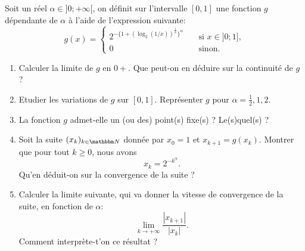 \begin{exercice}

Soit un réel $\alpha \in ]0;+\infty[$, on définit sur l'intervalle $[0,1]$ une fonction $g$ dépendante de $\alpha$ à l'aide de l'expression suivante:
\[
g(x) = \left\{
\begin{array}{ll}
2^{-\{ 1 + (\log_2(1/x))^{\frac1\alpha} \}^\alpha}&\quad \mbox{si } x\in]0;1],\\
0&\quad \mbox{sinon}.
\end{array}
\right.
\]

\begin{enumerate}

\item Calculer la limite de $g$ en $0+$. Que peut-on en déduire sur la continuité de $g$ ?

\item Etudier les variations de $g$ sur $[0,1]$. Représenter $g$ pour $\alpha = \frac12,1,2$.

\item La fonction $g$ admet-elle un (ou des) point(s) fixe(s) ? Le(s)quel(s) ?

\item Soit la suite $(x_k)_{k\in\eN}$ donnée par $x_0=1$ et $x_{k+1} = g(x_k)$. Montrer que pour tout $k\geq0$, nous avons
\[
x_{k} = 2^{-k^\alpha}.
\]
Qu'en déduit-on sur la convergence de la suite ?

\item Calculer la limite suivante, qui va donner la vitesse de convergence de la suite, en fonction de $\alpha$:
\[
\lim_{k \rightarrow +\infty} \frac{|x_{k+1}|}{|x_k|}.
\]
Comment interprète-t'on ce résultat ?

\end{enumerate}

\end{exercice}

\medskip

